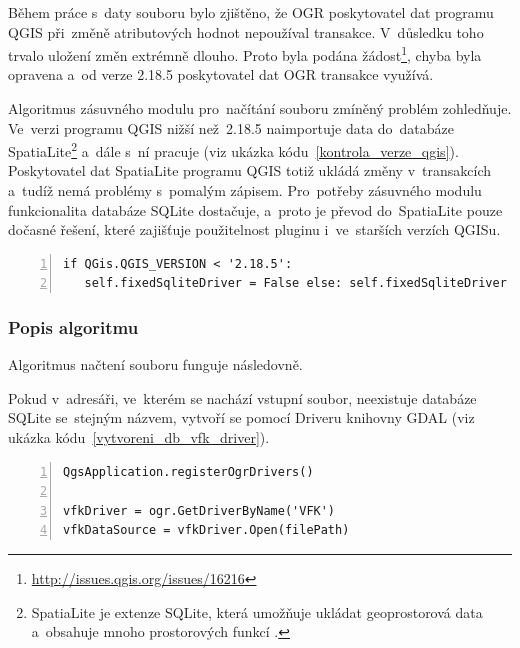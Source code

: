 Během práce s~daty souboru  bylo zjištěno, že OGR poskytovatel
dat programu QGIS při~změně atributových hodnot nepoužíval
transakce. V~důsledku toho trvalo uložení změn extrémně dlouho. Proto
byla podána
žádost\footnote{\url{http://issues.qgis.org/issues/16216}}, chyba
byla opravena a~od verze 2.18.5 poskytovatel dat OGR transakce
využívá.

Algoritmus zásuvného modulu pro~načítání  souboru zmíněný
problém zo\-hledňuje. Ve~verzi programu QGIS nižší než~2.18.5
naimportuje data do~databáze SpatiaLite\footnote{SpatiaLite je extenze
SQLite, která umožňuje ukládat geoprostorová data a~obsahuje mnoho
prostorových funkcí \citep{spatialite} \citep{wiki_spatialite}.}
a~dále s~ní pracuje (viz ukázka
kódu~\ref{kontrola_verze_qgis}). Poskytovatel dat SpatiaLite programu
QGIS totiž ukládá změny v~transakcích a~tudíž nemá problémy s~pomalým
zápisem. Pro~potřeby zásuvného modulu funkcionalita databáze SQLite
dostačuje, a~proto je převod do~SpatiaLite pouze dočasné řešení, které
zajišťuje použitelnost pluginu i~ve~starších verzích QGISu.

{\scriptsize
\begin{lstlisting}[style=python, caption={Kontrola verze programu
QGIS}, captionpos=b, label=kontrola_verze_qgis, backgroundcolor =
\color{light-gray}, numbers=left]
if QGis.QGIS_VERSION < '2.18.5':
   self.fixedSqliteDriver = False else: self.fixedSqliteDriver = True
\end{lstlisting}}

\subsubsection{Popis algoritmu}
\label{popis_algoritmu_nacteni_vfk}

Algoritmus načtení  souboru funguje následovně.

Pokud v~adresáři, ve~kterém se nachází vstupní  soubor,
neexistuje databáze SQLite se~stejným názvem, vytvoří se pomocí
 Driveru knihovny GDAL (viz ukázka
kódu~\ref{vytvoreni_db_vfk_driver}).

{\scriptsize
\begin{lstlisting}[style=python, caption={Vytvoření SQLite databáze
pomocí VFK Driveru}, captionpos=b, label=vytvoreni_db_vfk_driver,
backgroundcolor = \color{light-gray}, numbers=left]
QgsApplication.registerOgrDrivers()

vfkDriver = ogr.GetDriverByName('VFK')
vfkDataSource = vfkDriver.Open(filePath)
\end{lstlisting}}

